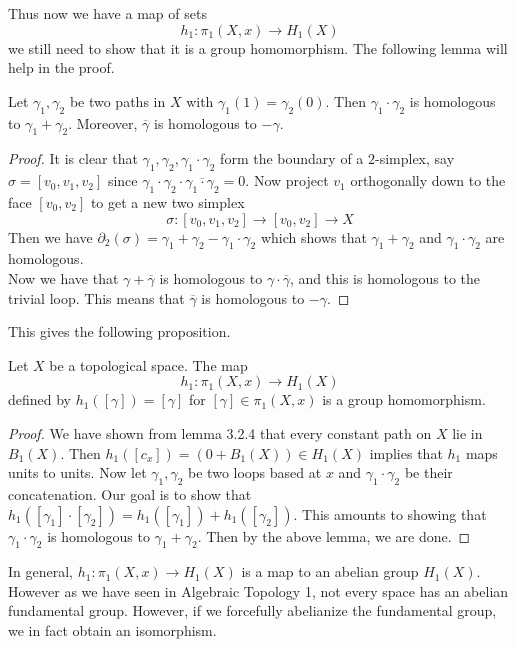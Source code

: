 \documentclass[a4paper]{article}
\begin{document}
Thus now we have a map of sets $$h_1:\pi_1(X,x)\to H_1(X)$$ we still need to show that it is a group homomorphism. The following lemma will help in the proof. 

\begin{lmm}{}{} Let $\gamma_1,\gamma_2$ be two paths in $X$ with $\gamma_1(1)=\gamma_2(0)$. Then $\gamma_1\cdot\gamma_2$ is homologous to $\gamma_1+\gamma_2$. Moreover, $\overline{\gamma}$ is homologous to $-\gamma$. 
\begin{proof}
It is clear that $\gamma_1,\gamma_2,\gamma_1\cdot\gamma_2$ form the boundary of a $2$-simplex, say $\sigma=[v_0,v_1,v_2]$ since $\gamma_1\cdot\gamma_2\cdot\overline{\gamma_1\cdot\gamma_2}=0$. Now project $v_1$ orthogonally down to the face $[v_0,v_2]$ to get a new two simplex $$\sigma:[v_0,v_1,v_2]\to[v_0,v_2]\to X$$ Then we have $\partial_2(\sigma)=\gamma_1+\gamma_2-\gamma_1\cdot\gamma_2$ which shows that $\gamma_1+\gamma_2$ and $\gamma_1\cdot\gamma_2$ are homologous. \\

Now we have that $\gamma+\overline{\gamma}$ is homologous to $\gamma\cdot\overline{\gamma}$, and this is homologous to the trivial loop. This means that $\overline{\gamma}$ is homologous to $-\gamma$. 
\end{proof}
\end{lmm}

This gives the following proposition. 

\begin{prp}{}{} Let $X$ be a topological space. The map $$h_1:\pi_1(X,x)\to H_1(X)$$ defined by $h_1([\gamma])=[\gamma]$ for $[\gamma]\in\pi_1(X,x)$ is a group homomorphism. 
\begin{proof}
We have shown from lemma 3.2.4 that every constant path on $X$ lie in $B_1(X)$. Then $h_1([c_x])=(0+B_1(X))\in H_1(X)$ implies that $h_1$ maps units to units. Now let $\gamma_1,\gamma_2$ be two loops based at $x$ and $\gamma_1\cdot\gamma_2$ be their concatenation. Our goal is to show that $h_1([\gamma_1]\cdot[\gamma_2])=h_1([\gamma_1])+h_1([\gamma_2])$. This amounts to showing that $\gamma_1\cdot\gamma_2$ is homologous to $\gamma_1+\gamma_2$. Then by the above lemma, we are done. 
\end{proof}
\end{prp}

In general, $h_1:\pi_1(X,x)\to H_1(X)$ is a map to an abelian group $H_1(X)$. However as we have seen in Algebraic Topology 1, not every space has an abelian fundamental group. However, if we forcefully abelianize the fundamental group, we in fact obtain an isomorphism. 
\end{document}
